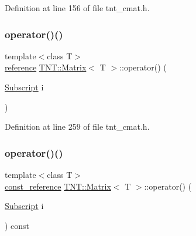 Definition at line 156 of file tnt\+\_\+cmat.\+h.

\mbox{\label{classTNT_1_1Matrix_a68a3f310698807a973801db39bcc739d}} 
\subsubsection{\texorpdfstring{operator()()}{operator()()}\hspace{0.1cm}{\footnotesize\ttfamily [1/4]}}
{\footnotesize\ttfamily template$<$class T$>$ \\
\hyperlink{classTNT_1_1Matrix_a129951783800dd85d3dcc1f6dd2062f9}{reference} \hyperlink{classTNT_1_1Matrix}{T\+N\+T\+::\+Matrix}$<$ T $>$\+::operator() (\begin{DoxyParamCaption}\item[{\hyperlink{namespaceTNT_af22e3f1460e145c04ce4e7d701e4c1c1}{Subscript}}]{i }\end{DoxyParamCaption})\hspace{0.3cm}{\ttfamily [inline]}}



Definition at line 259 of file tnt\+\_\+cmat.\+h.

\mbox{\label{classTNT_1_1Matrix_a2d4b38e38eea583a55ed151960fb0c7f}} 
\subsubsection{\texorpdfstring{operator()()}{operator()()}\hspace{0.1cm}{\footnotesize\ttfamily [2/4]}}
{\footnotesize\ttfamily template$<$class T$>$ \\
\hyperlink{classTNT_1_1Matrix_a6d3ceefbf1675aad4acadac4f78ed04b}{const\+\_\+reference} \hyperlink{classTNT_1_1Matrix}{T\+N\+T\+::\+Matrix}$<$ T $>$\+::operator() (\begin{DoxyParamCaption}\item[{\hyperlink{namespaceTNT_af22e3f1460e145c04ce4e7d701e4c1c1}{Subscript}}]{i }\end{DoxyParamCaption}) const\hspace{0.3cm}{\ttfamily [inline]}}



